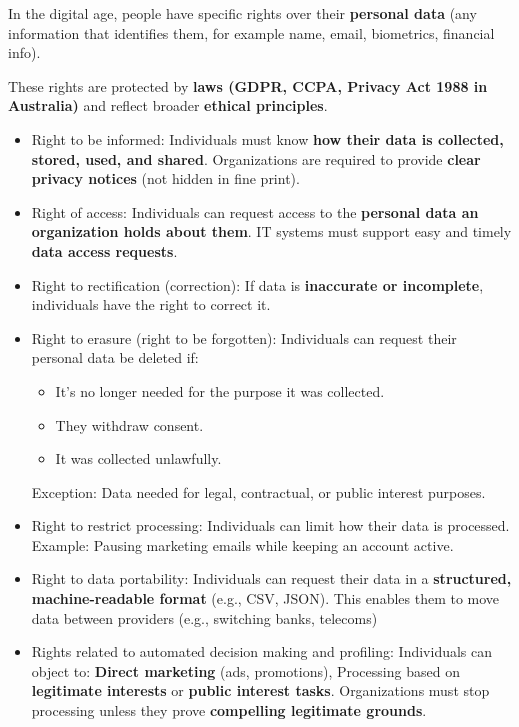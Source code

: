 \indent 

In the digital age, people have specific rights over their \textbf{personal data} (any information that identifies them, for example name, email, biometrics, financial info). 

These rights are protected by \textbf{laws (GDPR, CCPA, Privacy Act 1988 in 
Australia)} and reflect broader \textbf{ethical principles}.

\begin{itemize}
    \item Right to be informed: Individuals must know \textbf{how their data is collected, stored, used, and shared}. Organizations are required to provide \textbf{clear privacy notices} (not hidden in fine print).
    \item Right of access: Individuals can request access to the \textbf{personal data an organization holds about them}. IT systems must support easy and timely \textbf{data access requests}.
    \item Right to rectification (correction): If data is \textbf{inaccurate or incomplete}, individuals have the right to correct it.
    \item Right to erasure (right to be forgotten): Individuals can request their personal data be deleted if:
        \begin{itemize}
            \item It’s no longer needed for the purpose it was collected.
            \item They withdraw consent.
            \item It was collected unlawfully.
        \end{itemize}
        Exception: Data needed for legal, contractual, or public interest purposes.
    \item Right to restrict processing: Individuals can limit how their data is processed. Example: Pausing marketing emails while keeping an account active.
    \item Right to data portability: Individuals can request their data in a \textbf{structured, machine-readable format} (e.g., CSV, JSON). This enables them to move data between providers (e.g., switching banks, telecoms)
    \item Rights related to automated decision making and profiling: Individuals can object to: \textbf{Direct marketing} (ads, promotions), Processing based on \textbf{legitimate interests} or \textbf{public interest tasks}. Organizations must stop processing unless they prove \textbf{compelling legitimate grounds}.
\end{itemize}

